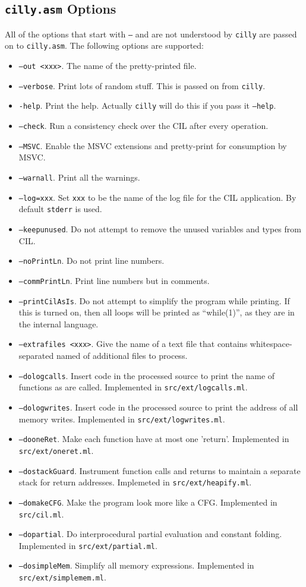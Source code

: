 \documentclass{article}
\def\t#1{{\tt #1}}
\begin{document}
 
  \subsection{\t{cilly.asm} Options}

 All of the options that start with \t{--} and are not understood by
\t{cilly} are passed on to \t{cilly.asm}. The following options are
supported:
\begin{itemize}
\item \t{--out <xxx>}. The name of the pretty-printed file.
\item \t{--verbose}. Print lots of random stuff. This is passed on from
\t{cilly}.
\item \t{-help}. Print the help. Actually \t{cilly} will do this if you
      pass it \t{--help}.  
\item \t{--check}. Run a consistency check over the CIL after every operation. 
\item \t{--MSVC}. Enable the MSVC extensions and pretty-print for consumption
by MSVC.
\item \t{--warnall}. Print all the warnings.
\item \t{--log=xxx}. Set \t{xxx} to be the name of the log file for the CIL
application. By default \t{stderr} is used.
\item \t{--keepunused}. Do not attempt to remove the unused variables and
       types from CIL. 
\item \t{--noPrintLn}. Do not print line numbers.
\item \t{--commPrintLn}. Print line numbers but in comments.
\item \t{--printCilAsIs}. Do not attempt to simplify the program while
  printing. If this is turned on, then all loops will be printed as
  ``while(1)'', as they are in the internal language.
\item \t{--extrafiles <xxx>}. Give the name of a text file that contains
whitespace-separated named of additional files to process.

\item \t{--dologcalls}. Insert code in the processed source to print the name of
functions as are called. Implemented in \t{src/ext/logcalls.ml}.
\item \t{--dologwrites}. Insert code in the processed source to print the
address of all memory writes. Implemented in \t{src/ext/logwrites.ml}.
\item \t{--dooneRet}. Make each function have at most one 'return'.
Implemented in \t{src/ext/oneret.ml}. 
\item \t{--dostackGuard}. Instrument function calls and returns to
maintain a separate stack for return addresses. Implemeted in
\t{src/ext/heapify.ml}. 
\item \t{--domakeCFG}. Make the program look more like a CFG. Implemented
in \t{src/cil.ml}. 
\item \t{--dopartial}. Do interprocedural partial evaluation and
constant folding. Implemented in \t{src/ext/partial.ml}. 
\item \t{--dosimpleMem}. Simplify all memory expressions. Implemented in
\t{src/ext/simplemem.ml}. 


\end{itemize}
\end{document}
